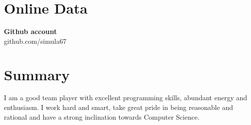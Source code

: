 \documentclass[line,margin]{res}
\begin{document}
\begin{resume}
\section{Online Data}
{\bf Github account}\\
github.com/simula67\\

\section{Summary}
I am a good team player with excellent programming skills, abundant energy and enthusiasm. I work hard and smart, take great pride in being reasonable and rational and have a strong inclination towards Computer Science.

\end{resume}
\end{document}
